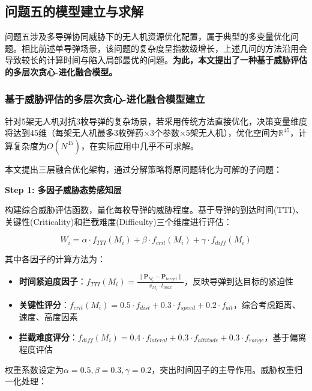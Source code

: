 \documentclass[fontset=SimSun]{ctexart}
\begin{document}
\subsection{问题五的模型建立与求解}

问题五涉及多导弹协同威胁下的无人机资源优化配置，属于典型的多变量优化问题。相比前述单导弹场景，该问题的复杂度呈指数级增长，上述几问的方法沿用会导致较长的计算时间与陷入局部最优的问题。\textbf{为此，本文提出了一种基于威胁评估的多层次贪心-进化融合模型。}

\subsubsection{基于威胁评估的多层次贪心-进化融合模型建立}

针对5架无人机对抗3枚导弹的复杂场景，若采用传统方法直接优化，决策变量维度将达到45维（每架无人机最多3枚弹药×3个参数×5架无人机），优化空间为$\mathbb{R}^{45}$，计算复杂度为$O(N^{45})$，在实际应用中几乎不可求解。

本文提出三层融合优化架构，通过分解策略将原问题转化为可解的子问题：

\noindent \textbf{Step 1: 多因子威胁态势感知层}

构建综合威胁评估函数，量化每枚导弹的威胁程度。基于导弹的到达时间(TTI)、关键性(Criticality)和拦截难度(Difficulty)三个维度进行评估：

\begin{equation}
W_i = \alpha \cdot f_{TTI}(M_i) + \beta \cdot f_{crit}(M_i) + \gamma \cdot f_{diff}(M_i)
\end{equation}

其中各因子的计算方法为：
\begin{itemize}[leftmargin=1.5cm]
    \item \textbf{时间紧迫度因子}：$f_{TTI}(M_i) = \frac{\|\mathbf{P}_{M_i} - \mathbf{P}_{target}\|}{v_{M_i} \cdot t_{max}}$，反映导弹到达目标的紧迫性
    \item \textbf{关键性评分}：$f_{crit}(M_i) = 0.5 \cdot f_{dist} + 0.3 \cdot f_{speed} + 0.2 \cdot f_{alt}$，综合考虑距离、速度、高度因素
    \item \textbf{拦截难度评分}：$f_{diff}(M_i) = 0.4 \cdot f_{lateral} + 0.3 \cdot f_{altitude} + 0.3 \cdot f_{range}$，基于偏离程度评估
\end{itemize}

权重系数设定为$\alpha=0.5, \beta=0.3, \gamma=0.2$，突出时间因子的主导作用。威胁权重归一化处理：
\end{document}
